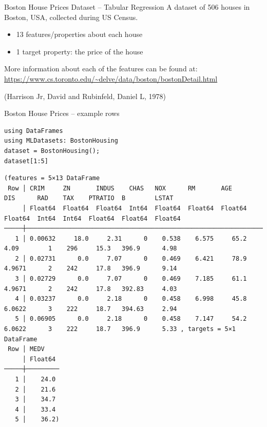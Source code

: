 \documentclass[10pt]{beamer}
\begin{document}
\begin{frame}[label={sec:org1f96c59}]{Boston House Prices Dataset -- Tabular Regression}
A dataset of 506 houses in Boston, USA, collected during US Census.

\begin{itemize}
\item 13 features/properties about each house
\item 1 target property: the price of the house
\end{itemize}

More information about each of the features can be found at: \url{https://www.cs.toronto.edu/\~delve/data/boston/bostonDetail.html}

(Harrison Jr, David and Rubinfeld, Daniel L, 1978)
\end{frame}

\begin{frame}[label={sec:orgfbdc84d},fragile]{Boston House Prices -- example rows}
 \begin{verbatim}
using DataFrames
using MLDatasets: BostonHousing
dataset = BostonHousing();
dataset[1:5]
\end{verbatim}

\begin{verbatim}
(features = 5×13 DataFrame
 Row │ CRIM     ZN       INDUS    CHAS   NOX      RM       AGE      DIS      RAD    TAX    PTRATIO  B        LSTAT   
     │ Float64  Float64  Float64  Int64  Float64  Float64  Float64  Float64  Int64  Int64  Float64  Float64  Float64 
─────┼────────────────────────────────────────────────────────────────────────────────────────────────────────────────
   1 │ 0.00632     18.0     2.31      0    0.538    6.575     65.2   4.09        1    296     15.3   396.9      4.98 
   2 │ 0.02731      0.0     7.07      0    0.469    6.421     78.9   4.9671      2    242     17.8   396.9      9.14
   3 │ 0.02729      0.0     7.07      0    0.469    7.185     61.1   4.9671      2    242     17.8   392.83     4.03
   4 │ 0.03237      0.0     2.18      0    0.458    6.998     45.8   6.0622      3    222     18.7   394.63     2.94
   5 │ 0.06905      0.0     2.18      0    0.458    7.147     54.2   6.0622      3    222     18.7   396.9      5.33 , targets = 5×1 DataFrame
 Row │ MEDV
     │ Float64
─────┼─────────
   1 │    24.0
   2 │    21.6
   3 │    34.7
   4 │    33.4
   5 │    36.2)
\end{verbatim}
\end{frame}
\end{document}
